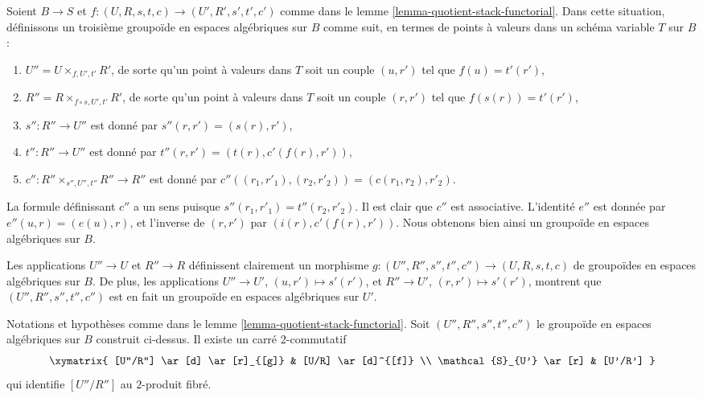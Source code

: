 \noindent
Soient $B \to S$ et $f : (U, R, s, t, c) \to (U', R', s', t', c')$ comme dans le lemme \ref{lemma-quotient-stack-functorial}. Dans cette situation, définissons un troisième groupoïde en espaces algébriques sur $B$ comme suit, en termes de points à valeurs dans un schéma variable $T$ sur $B$ :
\begin{enumerate}
\item $U'' = U \times_{f, U', t'} R'$, de sorte qu'un point à valeurs dans $T$ soit un couple $(u, r')$ tel que $f(u) = t'(r')$,
\item $R'' = R \times_{f \circ s, U', t'} R'$, de sorte qu'un point à valeurs dans $T$ soit un couple $(r, r')$ tel que $f(s(r)) = t'(r')$,
\item $s'' : R'' \to U''$ est donné par $s''(r, r') = (s(r), r')$,
\item $t'' : R'' \to U''$ est donné par $t''(r, r') = (t(r), c'(f(r), r'))$,
\item $c'' : R'' \times_{s'', U'', t''} R'' \to R''$ est donné par $c''((r_1, r'_1), (r_2, r'_2)) = (c(r_1, r_2), r'_2)$.
\end{enumerate}
La formule définissant $c''$ a un sens puisque $s''(r_1, r'_1) = t''(r_2, r'_2)$. Il est clair que $c''$ est associative. L'identité $e''$ est donnée par $e''(u, r) = (e(u), r)$, et l'inverse de $(r, r')$ par $(i(r), c'(f(r), r'))$. Nous obtenons bien ainsi un groupoïde en espaces algébriques sur $B$.

\medskip\noindent
Les applications $U'' \to U$ et $R'' \to R$ définissent clairement un morphisme $g : (U'', R'', s'', t'', c'') \to (U, R, s, t, c)$ de groupoïdes en espaces algébriques sur $B$. De plus, les applications $U'' \to U'$, $(u, r') \mapsto s'(r')$, et $R'' \to U'$, $(r, r') \mapsto s'(r')$, montrent que $(U'', R'', s'', t'', c'')$ est en fait un groupoïde en espaces algébriques sur $U'$.

\begin{lemma}
\label{lemma-cartesian-square-of-morphism}
Notations et hypothèses comme dans le lemme \ref{lemma-quotient-stack-functorial}. Soit $(U'', R'', s'', t'', c'')$ le groupoïde en espaces algébriques sur $B$ construit ci-dessus. Il existe un carré $2$-commutatif
$$
\xymatrix{
[U''/R''] \ar[d] \ar[r]_{[g]} & [U/R] \ar[d]^{[f]} \\
\mathcal{S}_{U'} \ar[r] & [U'/R']
}
$$
qui identifie $[U''/R'']$ au $2$-produit fibré.
\end{lemma}

